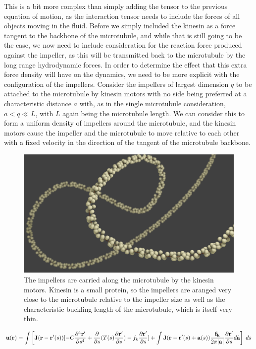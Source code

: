 \documentclass[11pt]{ucthesis}
\def\br{{\bf r}}
\begin{document}
This is a bit more complex than simply adding the tensor to the previous equation of motion, as the interaction tensor needs to include the forces of all objects moving in the fluid. 
Before we simply included the kinesin as a force tangent to the backbone of the microtubule, and while that is still going to be the case, we now need to include consideration for the reaction force produced against the impeller, as this will be transmitted back to the microtubule by the long range hydrodynamic forces.
In order to determine the effect that this extra force density will have on the dynamics, we need to be more explicit with the configuration of the impellers.
Consider the impellers of largest dimension $q$ to be attached to the microtubule by kinesin motors with no side being preferred at a characteristic distance $a$ with, as in the single microtubule consideration, $a < q \ll L$, with $L$ again being the microtubule length. 
We can consider this to form a uniform density of impellers around the microtubule, and the kinesin motors cause the impeller and the microtubule to move relative to each other with a fixed velocity in the direction of the tangent of the microtubule backbone. 
\begin{figure}[htp]
\begin{center}
\includegraphics[width=\hsize]{impeller.png}
\caption{ 
The impellers are carried along the microtubule by the kinesin motors. Kinesin is a small protein, so the impellers are aranged very close to the microtubule relative to the impeller size as well as the characteristic buckling length of the microtubule, which is itself very thin.
}
\label{fig:quadforce}
\end{center}
\end{figure}
\begin{equation}
\label{eq:fluidmodel}
 \mathbf{u}(\br) =  \int \left[ \mathbf{J}(\br-\br^\prime(s))[-C \frac{\partial^4 \br^\prime}{\partial s^4} + \frac{\partial}{\partial s}(T(s)\frac{\partial \br^\prime}{\partial s}) - f_k \frac{\partial \br^\prime}{\partial s}] + \int  \mathbf{J}(\br-\br^\prime(s)+ \mathbf{a}(s)) \frac{ \mathbf{f_k}}{2\pi| \mathbf{a}|} \frac{\partial \br^\prime}{\partial s} d \hat{ \mathbf{a}} \right] \;ds
\end{equation}
\end{document}
